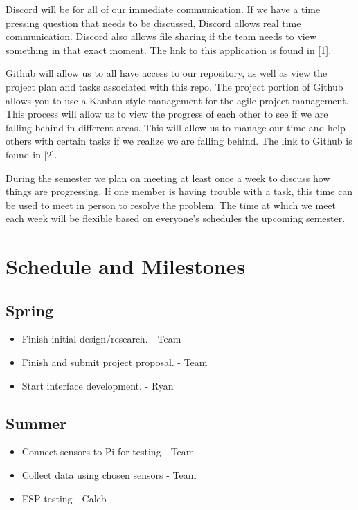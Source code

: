 \documentclass[letterpaper, 10 pt, conference]{ieeeconf}  %
\begin{document}
Discord will be for all of our immediate communication. If we have a time pressing question that needs to be discussed, Discord allows real time communication. Discord also allows file sharing if the team needs to view something in that exact moment. The link to this application is found in [1].

Github will allow us to all have access to our repository, as well as view the project plan and tasks associated with this repo. The project portion of Github allows you to use a Kanban style management for the agile project management. This process will allow us to view the progress of each other to see if we are falling behind in different areas. This will allow us to manage our time and help others with certain tasks if we realize we are falling behind. The link to Github is found in [2]. 

During the semester we plan on meeting at least once a week to discuss how things are progressing. If one member is having trouble with a task, this time can be used to meet in person to resolve the problem. The time at which we meet each week will be flexible based on everyone's schedules the upcoming semester.

\section{Schedule and Milestones}
\subsection{Spring}
\begin{itemize}
    \item Finish initial design/research. - Team
    \item Finish and submit project proposal. - Team
    \item Start interface development. - Ryan
\end{itemize}

\subsection{Summer}
\begin{itemize}
    \item Connect sensors to Pi for testing - Team
    \item Collect data using chosen sensors - Team
    \item ESP testing - Caleb
\end{itemize}
\end{document}
